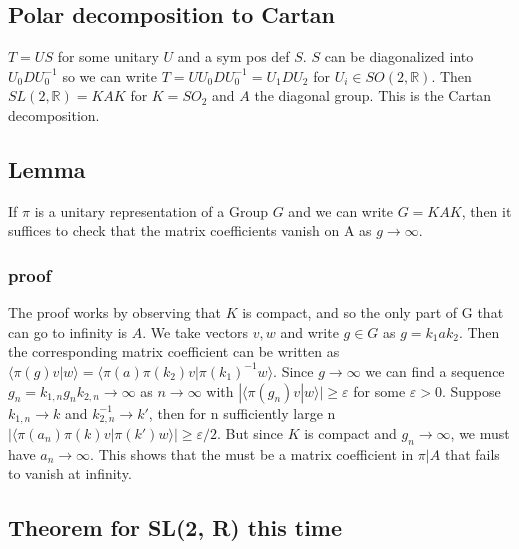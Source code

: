 \documentclass[
]{article}
\begin{document}
\hypertarget{polar-decomposition-to-cartan}{%
\subsection{Polar decomposition to
Cartan}\label{polar-decomposition-to-cartan}}

\(T = US\) for some unitary \(U\) and a sym pos def \(S\). \(S\) can be
diagonalized into \(U_0 D U_0^{-1}\) so we can write
\(T = U U_0 D U_0^{-1} = U_1 D U_2\) for \(U_i \in SO(2, \mathbb{R})\).
Then \(SL(2, \mathbb{R}) = KAK\) for \(K = SO_2\) and \(A\) the diagonal
group. This is the Cartan decomposition.

\hypertarget{lemma}{%
\subsection{Lemma}\label{lemma}}

If \(\pi\) is a unitary representation of a Group \(G\) and we can write
\(G = KAK\), then it suffices to check that the matrix coefficients
vanish on A as \(g \rightarrow \infty\).

\hypertarget{proof-1}{%
\subsubsection{proof}\label{proof-1}}

The proof works by observing that \(K\) is compact, and so the only part
of G that can go to infinity is \(A\). We take vectors \(v, w\) and
write \(g \in G\) as \(g = k_1 a k_2\). Then the corresponding matrix
coefficient can be written as
\(\langle \pi(g)v|w \rangle = \langle \pi(a) \pi(k_2) v | \pi(k_1)^{-1} w \rangle\).
Since \(g \rightarrow \infty\) we can find a sequence
\(g_n = k_{1,n} g_{n} k_{2,n} \rightarrow \infty\) as
\(n \rightarrow \infty\) with
\(|\langle \pi(g_n) v | w \rangle | \geq \varepsilon\) for some
\(\varepsilon > 0\). Suppose \(k_{1,n} \rightarrow k\) and
\(k_{2,n}^{-1} \rightarrow k'\), then for n sufficiently large n
\(|\langle \pi(a_n)\pi(k)v | \pi(k') w \rangle | \geq \varepsilon/2\).
But since \(K\) is compact and \(g_n \rightarrow \infty\), we must have
\(a_n \rightarrow \infty\). This shows that the must be a matrix
coefficient in \(\pi | A\) that fails to vanish at infinity.

\hypertarget{theorem-for-sl2-r-this-time}{%
\subsection{Theorem for SL(2, R) this
time}\label{theorem-for-sl2-r-this-time}}
\end{document}
